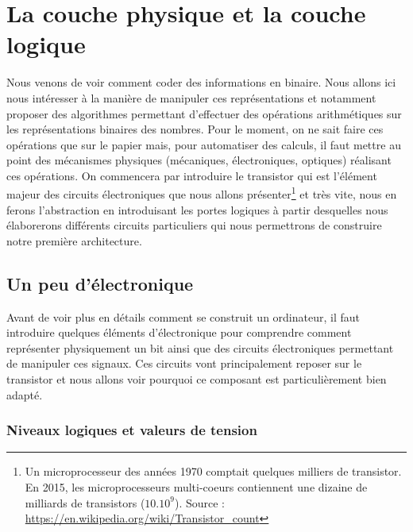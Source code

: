 
\chapter{La couche physique et la couche logique}

Nous venons de voir comment coder des informations en binaire. Nous allons ici nous intéresser à la manière de manipuler ces représentations et notamment proposer des algorithmes permettant d'effectuer des opérations arithmétiques sur les représentations binaires des nombres. Pour le moment, on ne sait faire ces opérations que sur le papier mais, pour automatiser des calculs, il faut mettre au point des mécanismes physiques (mécaniques, électroniques, optiques) réalisant ces opérations. On commencera par introduire le transistor qui est l'élément majeur des circuits électroniques que nous allons présenter\footnote{Un microprocesseur des années 1970 comptait quelques milliers de transistor. En 2015, les microprocesseurs multi-coeurs contiennent une dizaine de milliards de transistors ($10.10^{9}$). Source : \protect\url{https://en.wikipedia.org/wiki/Transistor_count}} et très vite, nous en ferons l'abstraction en introduisant les portes logiques à partir desquelles nous élaborerons différents circuits particuliers qui nous permettrons de construire notre première architecture.

\section{Un peu d'électronique}

Avant de voir plus en détails comment se construit un ordinateur, il faut introduire quelques éléments d'électronique pour comprendre comment représenter physiquement un bit ainsi que des circuits électroniques permettant de manipuler ces signaux. Ces circuits vont principalement reposer sur le transistor et nous allons voir pourquoi ce composant est particulièrement bien adapté. 


\subsection{Niveaux logiques et valeurs de tension}


